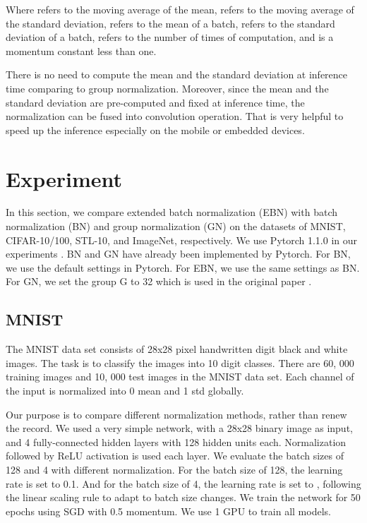 \documentclass[runningheads]{llncs}
\begin{document}
Where  refers to the moving average of the mean,    refers to the moving average of the standard deviation,  refers to the mean of a batch,  refers to the standard deviation of a batch,   refers to the number of times of computation, and  is a momentum constant less than one.  

There is no need to compute the mean and the standard deviation at inference time comparing to group normalization.  Moreover, since the mean and the standard deviation are pre-computed and fixed at inference time, the normalization can be fused into convolution operation. That is very helpful to speed up the inference especially on the mobile or embedded devices.

\section{Experiment}
In this section, we compare extended batch normalization (EBN) with batch normalization (BN) and group normalization (GN) on the datasets of MNIST, CIFAR-10/100, STL-10, and ImageNet, respectively. We use Pytorch 1.1.0 in our experiments . BN and GN have already been implemented by Pytorch. For BN, we use the default settings in Pytorch. For EBN, we use the same settings as BN. For GN, we set the group G to 32 which is used in the original paper \cite{wu2018group}.

\subsection{MNIST}
The MNIST \cite{lecun1998gradient} data set consists of 28x28 pixel  handwritten digit black and white images. The task is to classify the images into 10 digit classes. There are  60, 000 training  images and 10, 000 test images in the MNIST data set. Each channel of the input is normalized into 0 mean and 1 std globally. 


Our purpose is to compare different normalization methods, rather than renew the record. We used a very simple network, with a 28x28 binary image as input, and 4 fully-connected hidden layers with 128 hidden units each. Normalization followed by ReLU activation is used each layer. 
We evaluate the batch sizes of 128 and 4 with different normalization. For the batch size of 128, the learning rate is set to 0.1. And for the batch size of 4, the learning rate is set to , following the linear scaling rule \cite{goyal2017accurate} to adapt to batch size changes. We train the network for 50 epochs using SGD with 0.5 momentum. We use 1 GPU to train all models.
\end{document}
